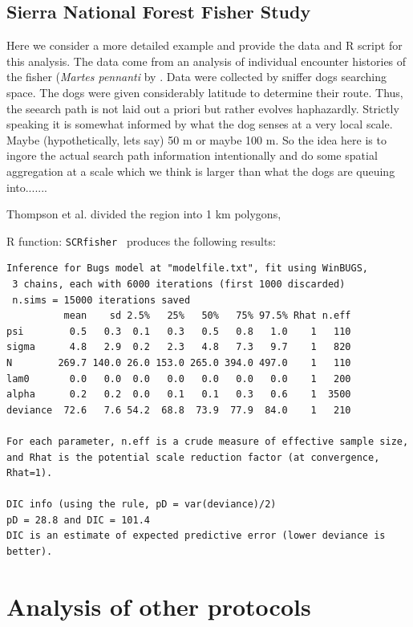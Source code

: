 \subsection{Sierra National Forest Fisher Study}

Here we consider a more detailed example and provide the data and R
script for this analysis. 
The data come from an analysis of individual encounter histories of
the fisher ({\it Martes pennanti} by \citet{thompson_etal:2012}. Data
were collected by sniffer dogs searching space. The dogs were given
considerably latitude to determine their route.
Thus, the seearch path is not laid out a
priori but rather evolves haphazardly.  Strictly speaking it is
somewhat informed by what the dog senses at a very local scale. Maybe
(hypothetically, lets say) 
50 m or maybe 100 m.
So the idea here is to ingore the actual search path information
intentionally and do some spatial aggregation at a scale which we
think is larger than what the dogs are queuing into.......

Thompson et al. divided the region into 1 km polygons,

R function: \mbox{\tt SCRfisher  } produces the following results:

{\small
\begin{verbatim}
Inference for Bugs model at "modelfile.txt", fit using WinBUGS,
 3 chains, each with 6000 iterations (first 1000 discarded)
 n.sims = 15000 iterations saved
          mean    sd 2.5%   25%   50%   75% 97.5% Rhat n.eff
psi        0.5   0.3  0.1   0.3   0.5   0.8   1.0    1   110
sigma      4.8   2.9  0.2   2.3   4.8   7.3   9.7    1   820
N        269.7 140.0 26.0 153.0 265.0 394.0 497.0    1   110
lam0       0.0   0.0  0.0   0.0   0.0   0.0   0.0    1   200
alpha      0.2   0.2  0.0   0.1   0.1   0.3   0.6    1  3500
deviance  72.6   7.6 54.2  68.8  73.9  77.9  84.0    1   210

For each parameter, n.eff is a crude measure of effective sample size,
and Rhat is the potential scale reduction factor (at convergence, Rhat=1).

DIC info (using the rule, pD = var(deviance)/2)
pD = 28.8 and DIC = 101.4
DIC is an estimate of expected predictive error (lower deviance is better).
\end{verbatim}
}


\section{Analysis of other protocols}

